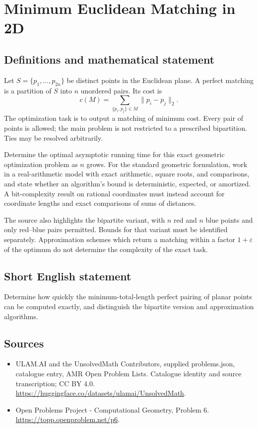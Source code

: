 \documentclass[11pt,a4paper]{article}
\begin{document}
\section*{Minimum Euclidean Matching in 2D}\label{statement}

\subsection{Definitions and mathematical statement}
Let $S=\{p_1,\ldots,p_{2n}\}$ be distinct points in the Euclidean plane.
A perfect matching is a partition of $S$ into $n$ unordered pairs. Its
cost is
\[
                  c(M)=\sum_{\{p_i,p_j\}\in M}\|p_i-p_j\|_2.
\]
The optimization task is to output a matching of minimum cost. Every
pair of points is allowed; the main problem is not restricted to a
prescribed bipartition. Ties may be resolved arbitrarily.

Determine the optimal asymptotic running time for this exact geometric
optimization problem as $n$ grows. For the standard geometric formulation,
work in a real-arithmetic model with exact arithmetic, square roots,
and comparisons, and state whether an algorithm's bound is deterministic,
expected, or amortized. A bit-complexity result on rational coordinates
must instead account for coordinate lengths and exact comparisons of
sums of distances.

The source also highlights the bipartite variant, with $n$ red and $n$
blue points and only red--blue pairs permitted. Bounds for that variant
must be identified separately. Approximation schemes which return a
matching within a factor $1+\varepsilon$ of the optimum do not determine
the complexity of the exact task.
\subsection{Short English statement}
Determine how quickly the minimum-total-length perfect pairing of
planar points can be computed exactly, and distinguish the bipartite
version and approximation algorithms.
\subsection{Sources}
\begin{itemize}
\item[S1] ULAM.AI and the UnsolvedMath Contributors, supplied problems.json, catalogue entry, AMR Open Problem Lists. Catalogue identity and source transcription; CC BY 4.0.
\url{https://huggingface.co/datasets/ulamai/UnsolvedMath}.
\item[S2] Open Problems Project - Computational Geometry, Problem 6. 
\url{https://topp.openproblem.net/p6}.
\end{itemize}
\end{document}
